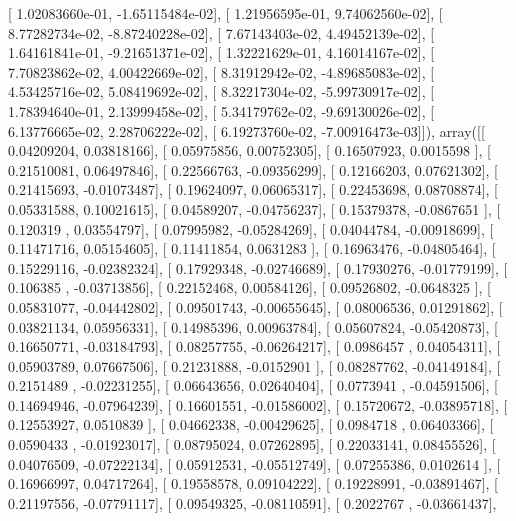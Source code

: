 \documentclass{article}
\begin{document}
       [  1.02083660e-01,  -1.65115484e-02],
       [  1.21956595e-01,   9.74062560e-02],
       [  8.77282734e-02,  -8.87240228e-02],
       [  7.67143403e-02,   4.49452139e-02],
       [  1.64161841e-01,  -9.21651371e-02],
       [  1.32221629e-01,   4.16014167e-02],
       [  7.70823862e-02,   4.00422669e-02],
       [  8.31912942e-02,  -4.89685083e-02],
       [  4.53425716e-02,   5.08419692e-02],
       [  8.32217304e-02,  -5.99730917e-02],
       [  1.78394640e-01,   2.13999458e-02],
       [  5.34179762e-02,  -9.69130026e-02],
       [  6.13776665e-02,   2.28706222e-02],
       [  6.19273760e-02,  -7.00916473e-03]]), array([[ 0.04209204,  0.03818166],
       [ 0.05975856,  0.00752305],
       [ 0.16507923,  0.0015598 ],
       [ 0.21510081,  0.06497846],
       [ 0.22566763, -0.09356299],
       [ 0.12166203,  0.07621302],
       [ 0.21415693, -0.01073487],
       [ 0.19624097,  0.06065317],
       [ 0.22453698,  0.08708874],
       [ 0.05331588,  0.10021615],
       [ 0.04589207, -0.04756237],
       [ 0.15379378, -0.0867651 ],
       [ 0.120319  ,  0.03554797],
       [ 0.07995982, -0.05284269],
       [ 0.04044784, -0.00918699],
       [ 0.11471716,  0.05154605],
       [ 0.11411854,  0.0631283 ],
       [ 0.16963476, -0.04805464],
       [ 0.15229116, -0.02382324],
       [ 0.17929348, -0.02746689],
       [ 0.17930276, -0.01779199],
       [ 0.106385  , -0.03713856],
       [ 0.22152468,  0.00584126],
       [ 0.09526802, -0.0648325 ],
       [ 0.05831077, -0.04442802],
       [ 0.09501743, -0.00655645],
       [ 0.08006536,  0.01291862],
       [ 0.03821134,  0.05956331],
       [ 0.14985396,  0.00963784],
       [ 0.05607824, -0.05420873],
       [ 0.16650771, -0.03184793],
       [ 0.08257755, -0.06264217],
       [ 0.0986457 ,  0.04054311],
       [ 0.05903789,  0.07667506],
       [ 0.21231888, -0.0152901 ],
       [ 0.08287762, -0.04149184],
       [ 0.2151489 , -0.02231255],
       [ 0.06643656,  0.02640404],
       [ 0.0773941 , -0.04591506],
       [ 0.14694946, -0.07964239],
       [ 0.16601551, -0.01586002],
       [ 0.15720672, -0.03895718],
       [ 0.12553927,  0.0510839 ],
       [ 0.04662338, -0.00429625],
       [ 0.0984718 ,  0.06403366],
       [ 0.0590433 , -0.01923017],
       [ 0.08795024,  0.07262895],
       [ 0.22033141,  0.08455526],
       [ 0.04076509, -0.07222134],
       [ 0.05912531, -0.05512749],
       [ 0.07255386,  0.0102614 ],
       [ 0.16966997,  0.04717264],
       [ 0.19558578,  0.09104222],
       [ 0.19228991, -0.03891467],
       [ 0.21197556, -0.07791117],
       [ 0.09549325, -0.08110591],
       [ 0.2022767 , -0.03661437],
\end{document}
